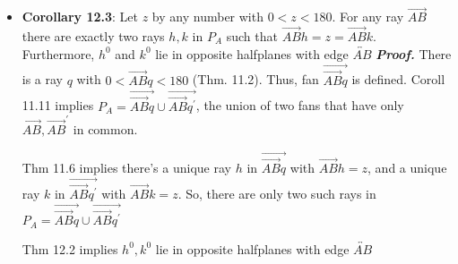 \documentclass{report}
\begin{document}
\begin{itemize}
            \item \textbf{Corollary 12.3}: Let $z$ by any number with $0 < z < 180$. For any ray $\overrightarrow{AB}$ there are exactly two rays $h,k$ in $P_{A}$ such that $\overrightarrow{AB}h = z = \overrightarrow{AB}k$. Furthermore, $h^{0}$ and $k^{0}$ lie in opposite halfplanes with edge $\overleftrightarrow{AB} $
                \bigbreak \noindent 
                \textbf{\textit{Proof.}} There is a ray $q$ with $0 < \overrightarrow{AB}q < 180 $ (Thm. 11.2). Thus, fan $\overrightarrow{\overrightarrow{AB}q} $ is defined.
                \bigbreak \noindent 
                Coroll 11.11 implies $P_{A}  = \overrightarrow{\overrightarrow{AB}q} \cup \overrightarrow{\overrightarrow{AB}q^{\prime}}$, the union of two fans that have only $\overrightarrow{AB}, \overrightarrow{AB}^{\prime}$ in common.
                \bigbreak \noindent 
                \begin{figure}[ht]
                    \centering
                    \label{fig:threefans}
                \end{figure}
                \bigbreak \noindent 
                Thm 11.6 implies there's a unique ray $h$ in $\overrightarrow{\overrightarrow{AB}q}$ with $\overrightarrow{AB}h = z$, and a unique ray $k$ in $\overrightarrow{\overrightarrow{AB}q^{\prime}}$ with $\overrightarrow{AB}k  = z$. So, there are only two such rays in $P_{A} = \overrightarrow{\overrightarrow{AB}q} \cup \overrightarrow{\overrightarrow{AB}q^{\prime}}$
                \bigbreak \noindent 
                \begin{figure}[ht]
                    \centering
                    \label{fig:fourfans}
                \end{figure}
                \bigbreak \noindent 
                Thm 12.2 implies $h^{0}, k^{0}$ lie in opposite halfplanes with edge $\overleftrightarrow{AB}$

    \end{itemize}

    \pagebreak 
\end{document}
